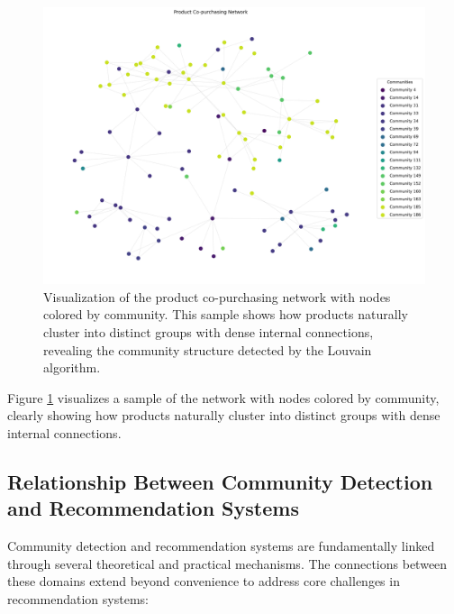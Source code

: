 \documentclass[conference]{IEEEtran}
\begin{document}
\begin{figure}[t]
    \centering
    \includegraphics[width=\columnwidth]{fig/copurchase_graph.png}
    \caption{Visualization of the product co-purchasing network with nodes colored by community. This sample shows how products naturally cluster into distinct groups with dense internal connections, revealing the community structure detected by the Louvain algorithm.}
    \label{fig:copurchase_graph}
\end{figure}

Figure \ref{fig:copurchase_graph} visualizes a sample of the network with nodes colored by community, clearly showing how products naturally cluster into distinct groups with dense internal connections.

\subsection{Relationship Between Community Detection and Recommendation Systems}

Community detection and recommendation systems are fundamentally linked through several theoretical and practical mechanisms. The connections between these domains extend beyond convenience to address core challenges in recommendation systems:
\end{document}
